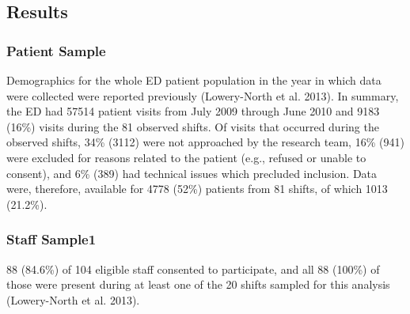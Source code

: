 \documentclass[
]{article}
\begin{document}
\hypertarget{results}{%
\subsection{Results}\label{results}}

\hypertarget{patient-sample}{%
\subsubsection{Patient Sample}\label{patient-sample}}

Demographics for the whole ED patient population in the year in which
data were collected were reported previously (Lowery-North et al. 2013).
In summary, the ED had 57514 patient visits from July 2009 through June
2010 and 9183 (16\%) visits during the 81 observed shifts. Of visits
that occurred during the observed shifts, 34\% (3112) were not
approached by the research team, 16\% (941) were excluded for reasons
related to the patient (e.g., refused or unable to consent), and 6\%
(389) had technical issues which precluded inclusion. Data were,
therefore, available for 4778 (52\%) patients from 81 shifts, of which
1013 (21.2\%).

\hypertarget{staff-sample1}{%
\subsubsection{Staff Sample1}\label{staff-sample1}}

88 (84.6\%) of 104 eligible staff consented to participate, and all 88
(100\%) of those were present during at least one of the 20 shifts
sampled for this analysis (Lowery-North et al. 2013).
\end{document}
